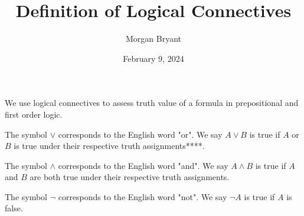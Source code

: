 \documentclass[a4paper]{article}
\title{Definition of Logical Connectives}
\date{February 9, 2024}
\author{Morgan Bryant}
\begin{document}
\maketitle
\par{We use logical connectives to assess truth value of a formula in prepositional and first order logic.}\par{The symbol \(\lor\) corresponds to the English word "or". We say \(A  \lor  B\) is true if \(A\) or \(B\) is true under their respective truth assignments****.}\par{The symbol \(\land\) corresponds to the English word "and". We say \(A \land  B\) is true if \(A\) and \(B\) are both true under their respective truth assignments.}\par{The symbol \(\neg\) corresponds to the English word "not". We say \(\neg  A\) is true if \(A\) is false.}
\printbibliography
\end{document}
